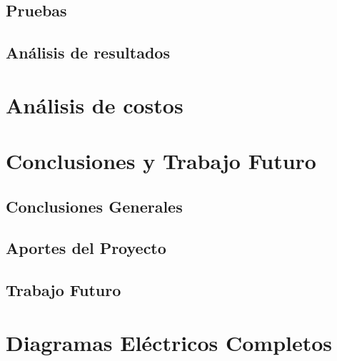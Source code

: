 \documentclass[a4paper,12pt]{report}
\begin{document}
\section{Pruebas}


\section{Análisis de resultados}




\chapter{Análisis de costos}

\chapter{Conclusiones y Trabajo Futuro}

\section{Conclusiones Generales}




\section{Aportes del Proyecto}



\section{Trabajo Futuro}




\appendix
\chapter{Diagramas Eléctricos Completos}

\end{document}
